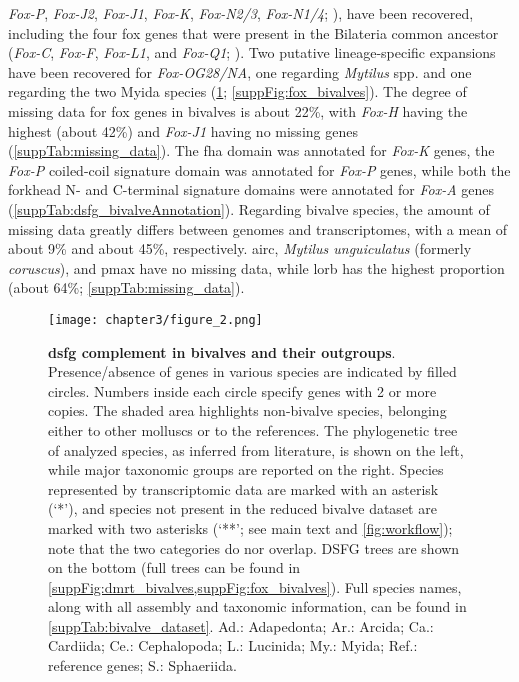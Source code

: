 \textit{Fox-P}, \textit{Fox-J2}, \textit{Fox-J1}, \textit{Fox-K}, \textit{Fox-N2/3}, \textit{Fox-N1/4}; ), have been recovered, including the four \gls{fox} genes that were present in the Bilateria common ancestor (\textit{Fox-C}, \textit{Fox-F}, \textit{Fox-L1}, and \textit{Fox-Q1}; ). Two putative lineage-specific expansions have been recovered for \textit{Fox-OG28/NA}, one regarding \textit{Mytilus} spp. and one regarding the two Myida species (\cref{fig:DSFG_bivalveCompilation}; \cref{suppFig:fox_bivalves}). The degree of missing data for \gls{fox} genes in bivalves is about 22\%, with \textit{Fox-H} having the highest (about 42\%) and \textit{Fox-J1} having no missing genes (\cref{suppTab:missing_data}). The \gls{fha} domain was annotated for \textit{Fox-K} genes, the \textit{Fox-P} coiled-coil signature domain was annotated for \textit{Fox-P} genes, while both the forkhead N- and C-terminal signature domains were annotated for \textit{Fox-A} genes (\cref{suppTab:dsfg_bivalveAnnotation}).
Regarding bivalve species, the amount of missing data greatly differs between genomes and transcriptomes, with a mean of about 9\% and about 45\%, respectively. \gls{airc}, \textit{Mytilus unguiculatus} (formerly \textit{coruscus}), and \gls{pmax} have no missing data, while \gls{lorb} has the highest proportion (about 64\%; \cref{suppTab:missing_data}).

\begin{figure}[t!]
	\centering
	\texttt{[image: chapter3/figure\_2.png]}
	
	\caption[\textbf{\gls{dsfg} complement in bivalves and their outgroups}]
	{
		\textbf{\gls{dsfg} complement in bivalves and their outgroups}. Presence/absence of genes in various species are indicated by filled circles. Numbers inside each circle specify genes with 2 or more copies. The shaded area highlights non-bivalve species, belonging either to other molluscs or to the references. The phylogenetic tree of analyzed species, as inferred from literature, is shown on the left, while major taxonomic groups are reported on the right. Species represented by transcriptomic data are marked with an asterisk (‘*’), and species not present in the reduced bivalve dataset are marked with two asterisks (‘**’; see main text and \cref{fig:workflow}); note that the two categories do nor overlap. DSFG trees are shown on the bottom (full trees can be found in \cref{suppFig:dmrt_bivalves,suppFig:fox_bivalves}). Full species names, along with all assembly and taxonomic information, can be found in \cref{suppTab:bivalve_dataset}.  Ad.: Adapedonta; Ar.: Arcida; Ca.: Cardiida; Ce.: Cephalopoda; L.: Lucinida; My.: Myida; Ref.: reference genes; S.: Sphaeriida.
	}
	\label{fig:DSFG_bivalveCompilation}
\end{figure}


